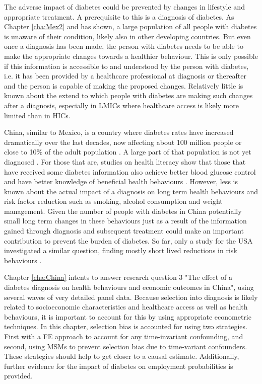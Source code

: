 The adverse impact of diabetes could be prevented by changes in lifestyle and appropriate treatment. A prerequisite to this is a diagnosis of diabetes. As Chapter \ref{cha:Mex2} and has shown, a large population of all people with diabetes is unaware of their condition, likely also in other developing countries. But even once a diagnosis has been made, the person with diabetes needs to be able to make the appropriate changes towards a healthier behaviour. This is only possible if this information is accessible to and understood by the person with diabetes, i.e. it has been provided by a healthcare professional at diagnosis or thereafter and the person is capable of making the proposed changes. Relatively little is known about the extend to which people with diabetes are making such changes after a diagnosis, especially in \acp{LMIC} where healthcare access is likely more limited than in \acp{HIC}.

China, similar to Mexico, is a country where diabetes rates have increased dramatically over the last decades, now affecting about 100 million people or close to 10\% of the adult population \parencite{Risk2016}. A large part of that population is not yet diagnosed \parencite{Wang2015}. For those that are, studies on health literacy show that those that have received some diabetes information also achieve better blood glucose control  and have better knowledge of beneficial health behaviours \parencite{Guo2012}. However, less is known about the actual impact of a diagnosis on long term health behaviours and risk factor reduction such as smoking, alcohol consumption and weight management. Given the number of people with diabetes in China potentially small long term changes in these behaviours just as a result of the information gained through diagnosis and subsequent treatment could make an important contribution to prevent the burden of diabetes. So far, only a study for the USA investigated a similar question, finding mostly short lived reductions in risk behaviours \parencite{Slade2012}. 

Chapter \ref{cha:China} intents to answer research question 3 "The effect of a diabetes diagnosis on health behaviours and economic outcomes in China", using several waves of very detailed panel data. Because selection into diagnosis is likely related to socioeconomic characteristics and healthcare access as well as health behaviours, it is important to account for this by using appropriate econometric techniques. In this chapter, selection bias is accounted for using two strategies. First with a \ac{FE} approach to account for any time-invariant confounding, and second, using \acp{MSM} to prevent selection bias due to time-variant confounders. These strategies should help to get closer to a causal estimate. Additionally, further evidence for the impact of diabetes on employment probabilities is provided.


